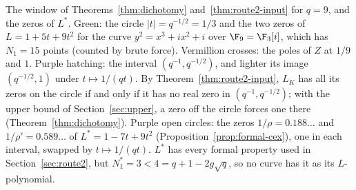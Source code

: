 \caption{The window of Theorems~\ref{thm:dichotomy}
and~\ref{thm:route2-input} for $q=9$, and the zeros of $L^*$. Green: the
circle $\lvert t\rvert=q^{-1/2}=1/3$ and the two zeros of $L=1+5t+9t^2$
for the curve $y^2=x^3+ix^2+i$ over $\F_9=\F_3[i]$, which has $N_1=15$
points (counted by brute force). Vermillion crosses: the poles of $Z$ at
$1/9$ and $1$. Purple hatching: the interval $(q^{-1},q^{-1/2})$, and
lighter its image $(q^{-1/2},1)$ under $t\mapsto1/(qt)$. By
Theorem~\ref{thm:route2-input}, $L_K$ has all its zeros on the circle if
and only if it has no real zero in $(q^{-1},q^{-1/2})$; with the upper
bound of Section~\ref{sec:upper}, a zero off the circle forces one there
(Theorem~\ref{thm:dichotomy}). Purple open circles: the zeros
$1/\rho=0.188\ldots$ and $1/\rho'=0.589\ldots$ of $L^*=1-7t+9t^2$
(Proposition~\ref{prop:formal-cex}), one in each interval, swapped by
$t\mapsto1/(qt)$. $L^*$ has every formal property used in
Section~\ref{sec:route2}, but $N_1^*=3<4=q+1-2g\sqrt q$, so no curve has
it as its $L$-polynomial.}
\label{fig:counterexample-roots}
